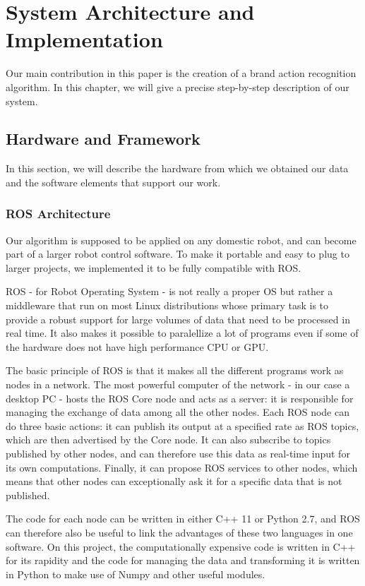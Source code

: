 \chapter{System Architecture and Implementation}
\label{chap:archi}

Our main contribution in this paper is the creation of a brand action recognition algorithm. In this chapter, we will give a precise step-by-step description of our system.
\section{Hardware and Framework}
In this section, we will describe the hardware from which we obtained our data and the software elements that support our work.
\subsection{ROS Architecture}
Our algorithm is supposed to be applied on any domestic robot, and can become part of a larger robot control software. To make it portable and easy to plug to larger projects, we implemented it to be fully compatible with ROS.

ROS \cite{ROS} - for Robot Operating System - is not really a proper OS but rather a middleware that run on most Linux distributions whose primary task is to provide a robust support for large volumes of data that need to be processed in real time. It also makes it possible to paralellize a lot of programs even if some of the hardware does not have high performance CPU or GPU.

The basic principle of ROS is that it makes all the different programs work as nodes in a network. The most powerful computer of the network - in our case a desktop PC - hosts the ROS Core node and acts as a server: it is responsible for managing the exchange of data among all the other nodes. Each ROS node can do three basic actions: it can publish its output at a specified rate as ROS topics, which are then advertised by the Core node. It can also subscribe to topics published by other nodes, and can therefore use this data as real-time input for its own computations. Finally, it can propose ROS services to other nodes, which means that other nodes can exceptionally ask it for a specific data that is not published. 

The code for each node can be written in either C++ 11 or Python 2.7, and ROS can therefore also be useful to link the advantages of these two languages in one software. On this project, the computationally expensive code is written in C++ for its rapidity and the code for managing the data and transforming it is written in Python to make use of Numpy and other useful modules.

